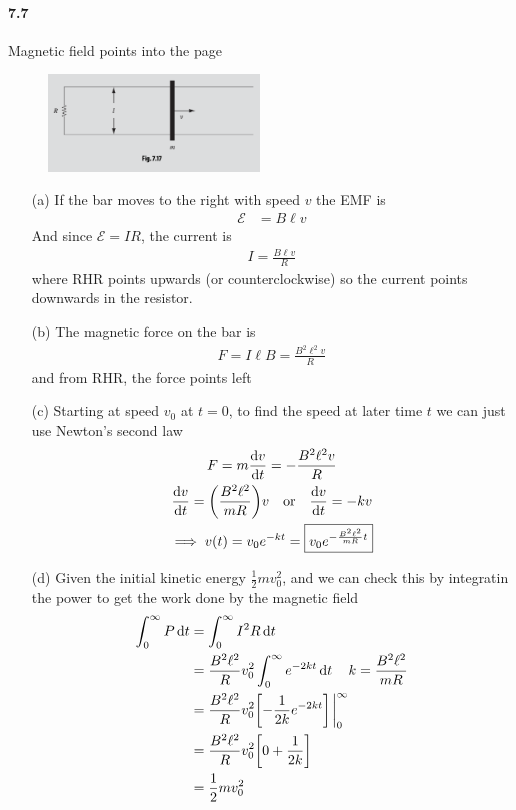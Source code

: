 \documentclass[../main.tex]{subfiles}
\begin{document}
\paragraph{7.7} Magnetic field points into the page
\begin{figure}[ht]
    \centering
    \includegraphics[width=0.5\textwidth]{hw11_4.png}
\end{figure}
\begin{itemize}
    \item [(a)] If the bar moves to the right with speed $v$ the EMF is
    \begin{align*}
        \mathcal{E} &= B \ell v
    \end{align*}
    And since $\mathcal{E} = IR$, the current is
    \begin{align*}
        \boxed{I = \frac{B \ell v}{R}}
    \end{align*}
    where RHR points upwards (or counterclockwise) so the current points downwards in the resistor.
    \item [(b)] The magnetic force on the bar is
    \begin{align*}
        \boxed{F = I\ell B = \frac{B^2 \ell^2 v}{R}}
    \end{align*}
    and from RHR, the force points left
    \item [(c)] Starting at speed $v_0$ at $t=0$, to find the speed at later time $t$ we can
    just use Newton's second law
    \begin{gather*}
        F = m \dv{v}{t} = -\frac{B^2 \ell^2 v}{R} \\
        \dv{v}{t} = \qt(\frac{B^2 \ell^2}{mR}) v \qor \dv{v}{t} = - kv \\
        \implies v(t) = v_0 e^{-kt} = \boxed{v_0 e^{-\frac{B^2 \ell^2}{mR} t}}
    \end{gather*}
    \item [(d)] Given the initial kinetic energy $\frac{1}{2} mv_0^2$, and we can check this by 
    integratin the power to get the work done by the magnetic field
    \begin{align*}
        \int_0^\infty P \dd{t} &= \int_0^\infty I^2 R \dd{t} \\
        &= \frac{B^2 \ell^2}{R} v_0^2 \int_0^\infty e^{-2kt} \dd{t} \quad k = \frac{B^2 \ell^2}{mR} \\
        &= \frac{B^2 \ell^2}{R} v_0^2 \qt[
            -\frac{1}{2k} e^{-2kt}
        ]\eval_0^\infty \\
        &= \frac{B^2 \ell^2}{R} v_0^2 \qt[
            0 + \frac{1}{2k}
        ] \\
        &= \frac{1}{2} m v_0^2
    \end{align*}
\end{itemize}
\end{document}
